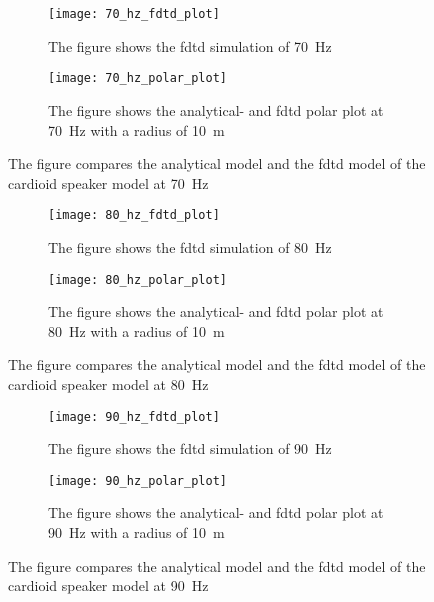 \begin{figure}[H]
\centering
\begin{subfigure}[htbp]{0.55\textwidth}
		\texttt{[image: 70\_hz\_fdtd\_plot]}
		\caption{The figure shows the \gls{fdtd} simulation of \SI{70}{\hertz}}
		\label{fig:fdtd_70_Hz}
\end{subfigure}
\begin{subfigure}[htbp]{0.35\textwidth}
		\texttt{[image: 70\_hz\_polar\_plot]}
		\caption{The figure shows the analytical- and \gls{fdtd} polar plot at \SI{70}{\hertz} with a radius of \SI{10}{\meter}}
		\label{fig:polar_70_Hz}
\end{subfigure} 
\caption{The figure compares the analytical model and the \gls{fdtd} model of the cardioid speaker model at \SI{70}{\hertz}}
\end{figure}


\begin{figure}[H]
\centering
\begin{subfigure}[htbp]{0.55\textwidth}
		\texttt{[image: 80\_hz\_fdtd\_plot]}
		\caption{The figure shows the \gls{fdtd} simulation of \SI{80}{\hertz}}
		\label{fig:fdtd_80_Hz}
\end{subfigure}
\begin{subfigure}[htbp]{0.35\textwidth}
		\texttt{[image: 80\_hz\_polar\_plot]}
		\caption{The figure shows the analytical- and \gls{fdtd} polar plot at \SI{80}{\hertz} with a radius of \SI{10}{\meter}}
		\label{fig:polar_80_Hz}
\end{subfigure} 
\caption{The figure compares the analytical model and the \gls{fdtd} model of the cardioid speaker model at \SI{80}{\hertz}}
\end{figure}


\begin{figure}[H]
\centering
\begin{subfigure}[htbp]{0.55\textwidth}
		\texttt{[image: 90\_hz\_fdtd\_plot]}
		\caption{The figure shows the \gls{fdtd} simulation of \SI{90}{\hertz}}
		\label{fig:fdtd_90_Hz}
\end{subfigure}
\begin{subfigure}[htbp]{0.35\textwidth}
		\texttt{[image: 90\_hz\_polar\_plot]}
		\caption{The figure shows the analytical- and \gls{fdtd} polar plot at \SI{90}{\hertz} with a radius of \SI{10}{\meter}}
		\label{fig:polar_90_Hz}
\end{subfigure} 
\caption{The figure compares the analytical model and the \gls{fdtd} model of the cardioid speaker model at \SI{90}{\hertz}}
\end{figure}


